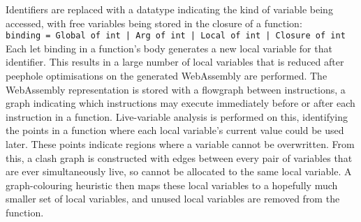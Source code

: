 Identifiers are replaced with a datatype indicating the kind of variable being accessed, with free variables being stored in the closure of a function:\\
\verb"binding = Global of int | Arg of int | Local of int | Closure of int"\\
Each let binding in a function's body generates a new local variable for that identifier. This results in a large number of local variables that is reduced after peephole optimisations on the generated WebAssembly are performed. The WebAssembly representation is stored with a flowgraph between instructions, a graph indicating which instructions may execute immediately before or after each instruction in a function. Live-variable analysis is performed on this, identifying the points in a function where each local variable's current value could be used later. These points indicate regions where a variable cannot be overwritten. From this, a clash graph is constructed with edges between every pair of variables that are ever simultaneously live, so cannot be allocated to the same local variable. A graph-colouring heuristic then maps these local variables to a hopefully much smaller set of local variables, and unused local variables are removed from the function.

